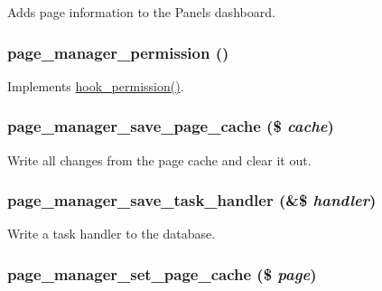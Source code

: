 Adds page information to the Panels dashboard. \hypertarget{page__manager_8module_a520d2afb3f70e8335e226e9e9c202493}{
\subsubsection[{page\_\-manager\_\-permission}]{\setlength{\rightskip}{0pt plus 5cm}page\_\-manager\_\-permission ()}}
\label{page__manager_8module_a520d2afb3f70e8335e226e9e9c202493}
Implements \hyperlink{group__hooks_ga2b22b45f4925f2478412477bae329713}{hook\_\-permission()}. \hypertarget{page__manager_8module_a5e03ee6eaeb49ed077fac91648d381b4}{
\subsubsection[{page\_\-manager\_\-save\_\-page\_\-cache}]{\setlength{\rightskip}{0pt plus 5cm}page\_\-manager\_\-save\_\-page\_\-cache (\$ {\em cache})}}
\label{page__manager_8module_a5e03ee6eaeb49ed077fac91648d381b4}
Write all changes from the page cache and clear it out. \hypertarget{page__manager_8module_ab349a10c030f96d61677ded4865a8988}{
\subsubsection[{page\_\-manager\_\-save\_\-task\_\-handler}]{\setlength{\rightskip}{0pt plus 5cm}page\_\-manager\_\-save\_\-task\_\-handler (\&\$ {\em handler})}}
\label{page__manager_8module_ab349a10c030f96d61677ded4865a8988}
Write a task handler to the database. \hypertarget{page__manager_8module_a87718088cd075fb9c3c6884df0e33212}{
\subsubsection[{page\_\-manager\_\-set\_\-page\_\-cache}]{\setlength{\rightskip}{0pt plus 5cm}page\_\-manager\_\-set\_\-page\_\-cache (\$ {\em page})}}
